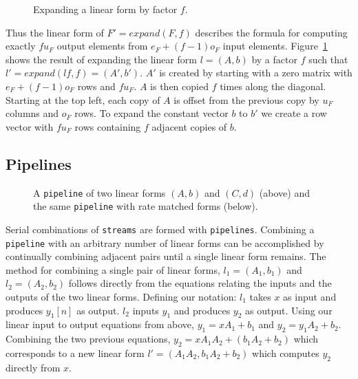 \begin{figure}
\center
\epsfxsize=3.0in
\caption{Expanding a linear form by factor $f$.}
\label{fig:expanding-a-matrix}
\vspace{-12pt}
\end{figure}

Thus the linear form of $F'=expand(F, f)$ describes the formula for computing
exactly $fu_F$ output elements from $e_F + (f-1)o_F$ input elements.
Figure~\ref{fig:expanding-a-matrix} shows the result of expanding the linear 
form $l = (A,b)$ by a factor $f$ such that $l' = expand(lf, f) = (A',b')$. 
$A'$ is created by starting with a zero matrix with $e_F+(f-1)o_F$ rows 
and $fu_F$. $A$ is then copied $f$ times along the
diagonal. Starting at the top left, each copy of $A$ is offset from the previous copy 
by $u_F$ columns and $o_F$ rows. To expand the constant vector $b$ to $b'$ we 
create a row vector with $fu_F$ rows containing $f$ adjacent copies of $b$.

\subsection{Pipelines}

\begin{figure}
\center
\epsfxsize=3.0in
\caption{A {\tt pipeline} of two linear forms $(A,b)$ and $(C,d)$ (above) and the same {\tt pipeline} with rate matched forms (below).}
\label{fig:combining-pipeline}
\vspace{-12pt}
\end{figure}

Serial combinations of {\tt streams} are formed with {\tt pipelines}.
Combining a {\tt pipeline} with an arbitrary number of linear forms can be accomplished 
by continually combining adjacent pairs until a single linear form remains. 
The method for combining a single pair of linear forms, $l_1=(A_1,b_1)$ and $l_2=(A_2,b_2)$ follows
directly from the equations relating the inputs and the outputs of the 
two linear forms. Defining our notation: $l_1$ takes $x$ as input and produces 
$y_1[n]$ as output. $l_2$ inputs $y_1$ and produces $y_2$ as output. 
Using our linear input to output equations from above, $y_1 = xA_1 + b_1$ 
and $y_2 = y_1A_2 + b_2$. Combining the two previous equations, $y_2 = xA_1A_2 + (b_1A_2 + b_2)$ 
which corresponds to a new linear form $l'=(A_1A_2, b_1A_2+b_2)$ which computes
$y_2$ directly from $x$.

